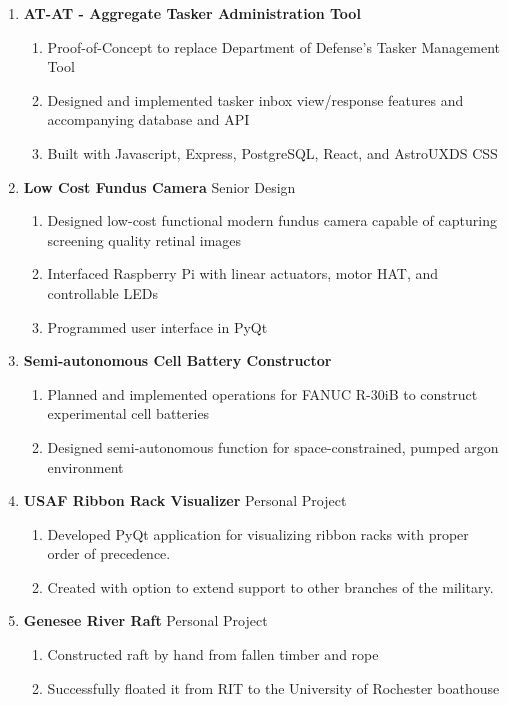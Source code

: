\documentclass[11pt]{article}
\begin{document}
\begin{enumerate}[label={}, itemsep=5pt]
    \item \textbf{AT-AT - Aggregate Tasker Administration Tool}
    \begin{enumerate}[label={--}]
        \item Proof-of-Concept to replace Department of Defense's Tasker Management Tool
        \item Designed and implemented tasker inbox view/response features and accompanying database and API
        \item Built with Javascript, Express, PostgreSQL, React, and AstroUXDS CSS
    \end{enumerate}
    \item \textbf{Low Cost Fundus Camera} \textbar{} Senior Design
    \begin{enumerate}[label={--}]
        \item Designed low-cost functional modern fundus camera capable of capturing screening quality retinal images
        \item Interfaced Raspberry Pi with linear actuators, motor HAT, and controllable LEDs
        \item Programmed user interface in PyQt
    \end{enumerate}
    \item \textbf{Semi-autonomous Cell Battery Constructor}
    \begin{enumerate}[label={--}]
        \item Planned and implemented operations for FANUC R-30iB to construct experimental cell batteries
        \item Designed semi-autonomous function for space-constrained, pumped argon environment
    \end{enumerate}
    \item \textbf{USAF Ribbon Rack Visualizer} \textbar{} Personal Project
    \begin{enumerate}[label={--}]
        \item Developed PyQt application for visualizing ribbon racks with proper order of precedence.
        \item Created with option to extend support to other branches of the military.
    \end{enumerate}
    \item \textbf{Genesee River Raft} \textbar{} Personal Project
    \begin{enumerate}[label={--}]
        \item Constructed raft by hand from fallen timber and rope
        \item Successfully floated it from RIT to the University of Rochester boathouse
    \end{enumerate}
\end{enumerate}
\end{document}

